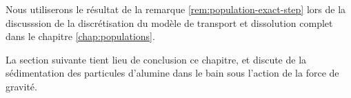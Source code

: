 Nous utiliserons le résultat de la remarque
\ref{rem:population-exact-step} lors de la discusssion de la
discrétisation du modèle de transport et dissolution complet dans le
chapitre \ref{chap:populations}.

La section suivante tient lieu de conclusion ce chapitre, et discute
de la sédimentation des particules d'alumine dans le bain sous
l'action de la force de gravité.

